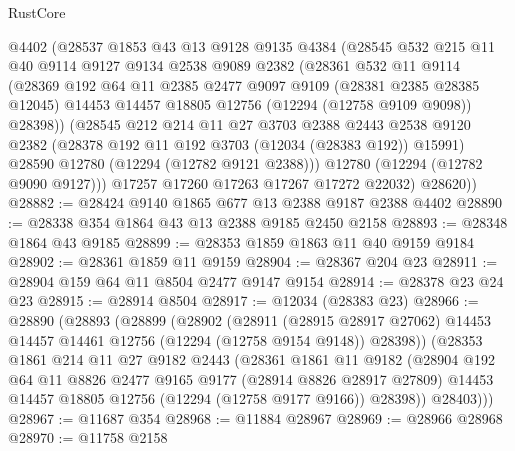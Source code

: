 \begin{lexlean}{RustCore}
\begin{coremodule}
        @4402
        (@28537
          @1853
          @43
          @13
          @9128
          @9135
          @4384
          (@28545
            @532
            @215
            @11
            @40
            @9114
            @9127
            @9134
            @2538
            @9089
            @2382
            (@28361
              @532
              @11
              @9114
              (@28369
                @192
                @64
                @11
                @2385
                @2477
                @9097
                @9109
                (@28381 @2385 @28385 @12045)
                @14453
                @14457
                @18805
                @12756
                (@12294 (@12758 @9109 @9098))
                @28398))
            (@28545
              @212
              @214
              @11
              @27
              @3703
              @2388
              @2443
              @2538
              @9120
              @2382
              (@28378 @192 @11 @192 @3703 (@12034 (@28383 @192)) @15991)
              @28590
              @12780
              (@12294 (@12782 @9121 @2388)))
            @12780
            (@12294 (@12782 @9090 @9127)))
          @17257
          @17260
          @17263
          @17267
          @17272
          @22032)
        @28620))
@28882 := @28424 @9140 @1865 @677 @13 @2388 @9187 @2388 @4402
@28890 := @28338 @354 @1864 @43 @13 @2388 @9185 @2450 @2158
@28893 := @28348 @1864 @43 @9185
@28899 := @28353 @1859 @1863 @11 @40 @9159 @9184
@28902 := @28361 @1859 @11 @9159
@28904 := @28367 @204 @23
@28911 := @28904 @159 @64 @11 @8504 @2477 @9147 @9154
@28914 := @28378 @23 @24 @23
@28915 := @28914 @8504
@28917 := @12034 (@28383 @23)
@28966 := @28890
    (@28893
      (@28899
        (@28902
          (@28911
            (@28915 @28917 @27062)
            @14453
            @14457
            @14461
            @12756
            (@12294 (@12758 @9154 @9148))
            @28398))
        (@28353
          @1861
          @214
          @11
          @27
          @9182
          @2443
          (@28361
            @1861
            @11
            @9182
            (@28904
              @192
              @64
              @11
              @8826
              @2477
              @9165
              @9177
              (@28914 @8826 @28917 @27809)
              @14453
              @14457
              @18805
              @12756
              (@12294 (@12758 @9177 @9166))
              @28398))
          @28403)))
@28967 := @11687 @354
@28968 := @11884 @28967
@28969 := @28966 @28968
@28970 := @11758 @2158

\end{coremodule}
\end{lexlean}
